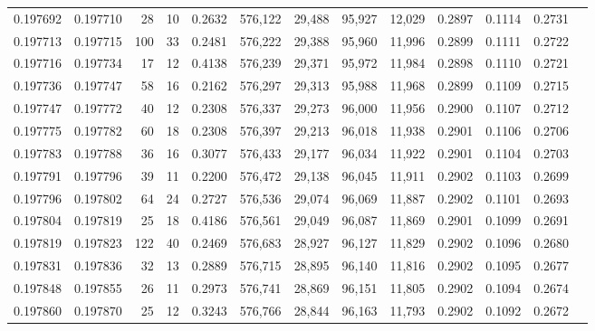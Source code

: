 \begin{tabular}{rrrrrrrrrrrrr}
0.197692 & 0.197710 &    28 &  10 &                                     0.2632 & 576,122 &  29,488 &  95,927 &  12,029 & 0.2897 & 0.1114 & 0.2731 \\
0.197713 & 0.197715 &   100 &  33 &                                     0.2481 & 576,222 &  29,388 &  95,960 &  11,996 & 0.2899 & 0.1111 & 0.2722 \\
0.197716 & 0.197734 &    17 &  12 &                                     0.4138 & 576,239 &  29,371 &  95,972 &  11,984 & 0.2898 & 0.1110 & 0.2721 \\
0.197736 & 0.197747 &    58 &  16 &                                     0.2162 & 576,297 &  29,313 &  95,988 &  11,968 & 0.2899 & 0.1109 & 0.2715 \\
0.197747 & 0.197772 &    40 &  12 &                                     0.2308 & 576,337 &  29,273 &  96,000 &  11,956 & 0.2900 & 0.1107 & 0.2712 \\
0.197775 & 0.197782 &    60 &  18 &                                     0.2308 & 576,397 &  29,213 &  96,018 &  11,938 & 0.2901 & 0.1106 & 0.2706 \\
0.197783 & 0.197788 &    36 &  16 &                                     0.3077 & 576,433 &  29,177 &  96,034 &  11,922 & 0.2901 & 0.1104 & 0.2703 \\
0.197791 & 0.197796 &    39 &  11 &                                     0.2200 & 576,472 &  29,138 &  96,045 &  11,911 & 0.2902 & 0.1103 & 0.2699 \\
0.197796 & 0.197802 &    64 &  24 &                                     0.2727 & 576,536 &  29,074 &  96,069 &  11,887 & 0.2902 & 0.1101 & 0.2693 \\
0.197804 & 0.197819 &    25 &  18 &                                     0.4186 & 576,561 &  29,049 &  96,087 &  11,869 & 0.2901 & 0.1099 & 0.2691 \\
0.197819 & 0.197823 &   122 &  40 &                                     0.2469 & 576,683 &  28,927 &  96,127 &  11,829 & 0.2902 & 0.1096 & 0.2680 \\
0.197831 & 0.197836 &    32 &  13 &                                     0.2889 & 576,715 &  28,895 &  96,140 &  11,816 & 0.2902 & 0.1095 & 0.2677 \\
0.197848 & 0.197855 &    26 &  11 &                                     0.2973 & 576,741 &  28,869 &  96,151 &  11,805 & 0.2902 & 0.1094 & 0.2674 \\
0.197860 & 0.197870 &    25 &  12 &                                     0.3243 & 576,766 &  28,844 &  96,163 &  11,793 & 0.2902 & 0.1092 & 0.2672 \\

\end{tabular}
